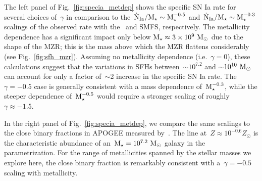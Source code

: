 \documentclass[foo.tex]{subfiles}
\begin{document}
The left panel of Fig.~\ref{fig:specia_metdep} shows the specific SN Ia rate
for several choices of~$\gamma$ in comparison to the~$\dot{\text{N}}_\text{Ia} /
\text{M}_\star \sim \text{M}_\star^{-0.5}$ and~$\dot{\text{N}}_\text{Ia} / \text{M}_\star \sim
\text{M}_\star^{-0.3}$ scalings of the observed rate with the~\citet{Bell2003} and
\citet{Baldry2012} SMFS, respectively.
The metallicity dependence has a significant impact only below
$\text{M}_\star \approx 3\times10^9~\text{M}_\odot$ due to the shape of the MZR;
this is the mass above which the MZR flattens considerably (see
Fig.~\ref{fig:sfh_mzr}).
Assuming no metallicity dependence (i.e.~$\gamma = 0$), these calculations
suggest that the variations in SFHs between~$\sim$$10^{7.2}$ and
$\sim$$10^{10}~\text{M}_\odot$ can account for only a factor of~$\sim$2 increase in the
specific SN Ia rate.
The~$\gamma = -0.5$ case is generally consistent with a mass dependence
of~$\text{M}_\star^{-0.3}$, while the steeper dependence of~$\text{M}_\star^{-0.5}$ would
require a stronger scaling of roughly~$\gamma \approx -1.5$.
\par
In the right panel of Fig.~\ref{fig:specia_metdep}, we compare the same
scalings to the close binary fractions in APOGEE measured by~\citet{Moe2019}.
The line at~$Z \approx 10^{-0.6} Z_\odot$ is the characteristic abundance of
an~$\text{M}_\star = 10^{7.2}~\text{M}_\odot$ galaxy in the~\citet{Zahid2014} parametrization.
For the range of metallicities spanned by the stellar masses we explore here,
the close binary fraction is remarkably consistent with a~$\gamma = -0.5$
scaling with metallicity.
\end{document}
